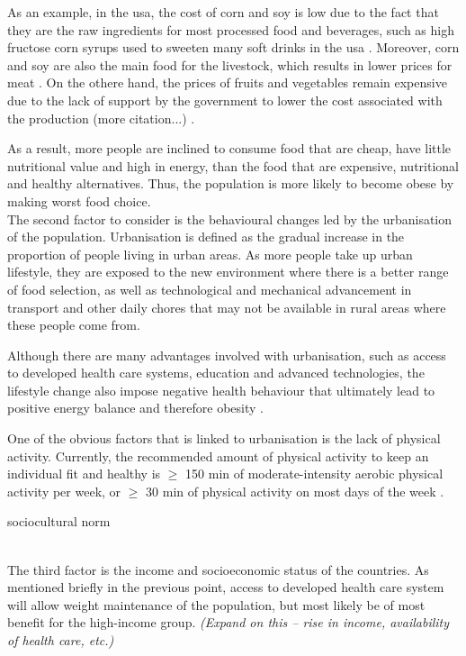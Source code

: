 As an example, in the \gls{usa}, the cost of corn and soy is low due to the fact that they are the raw ingredients for most processed food and beverages, such as high fructose corn syrups used to sweeten many soft drinks in the \gls{usa} \citep{Malik2013}.
Moreover, corn and soy are also the main food for the livestock, which results in lower prices for meat \citep{Malik2013}.
On the othere hand, the prices of fruits and vegetables remain expensive due to the lack of support by the government to lower the cost associated with the production (more citation...) \citep{Malik2013}.

As a result, more people are inclined to consume food that are cheap, have little nutritional value and high in energy, than the food that are expensive, nutritional and healthy alternatives.
Thus, the population is more likely to become obese by making worst food choice.\\

\noindent
The second factor to consider is the behavioural changes led by the urbanisation of the population.
Urbanisation is defined as the gradual increase in the proportion of people living in urban areas.
As more people take up urban lifestyle, they are exposed to the new environment where there is a better range of food selection, as well as technological and mechanical advancement in transport and other daily chores that may not be available in rural areas where these people come from.

Although there are many advantages involved with urbanisation, such as access to developed health care systems, education and advanced technologies, the lifestyle change also impose negative health behaviour that ultimately lead to positive energy balance and therefore obesity \citep{Malik2013}.

One of the obvious factors that is linked to urbanisation is the lack of physical activity.
Currently, the recommended amount of physical activity to keep an individual fit and healthy is $\geq$ 150 min of moderate-intensity aerobic physical activity per week, or $\geq$ 30 min of physical activity on most days of the week \citep{Pate1995, WHO2010}.


sociocultural norm


\citep{Malik2013}\\

\noindent
The third factor is the income and socioeconomic status of the countries.
As mentioned briefly in the previous point, access to developed health care system will allow weight maintenance of the population, but most likely be of most benefit for the high-income group.
\textit{(Expand on this -- rise in income, availability of health care, etc.)}
\citep{Malik2013}\\

